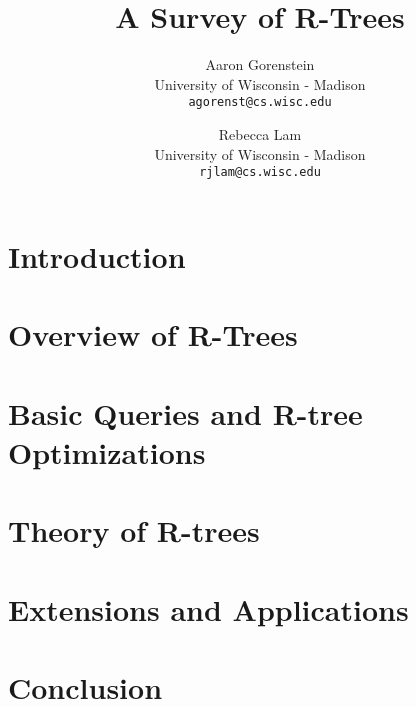 \documentclass[10pt, twocolumn]{article}
\title{A Survey of R-Trees}
\author{
	Aaron Gorenstein\\
	University of Wisconsin - Madison\\
	\texttt{agorenst@cs.wisc.edu}
	\and
	Rebecca Lam\\
	University of Wisconsin - Madison\\
	\texttt{rjlam@cs.wisc.edu}
}
\begin{document}
\newcommand{\rbase}{R}
\newcommand{\rstar}{$\text{R}^*$}
\newcommand{\rplus}{$\text{R}^+$}

\maketitle
\thispagestyle{empty}



\section{Introduction}
\label{sec:intro}


\section{Overview of R-Trees}
\label{sec:overview}


\section{Basic Queries and R-tree Optimizations}
\label{sec:impchal}


\section{Theory of R-trees}
\label{sec:dbchal}


\section{Extensions and Applications}
\label{sec:apps}


\section{Conclusion}
\label{sec:conc}




\end{document}

